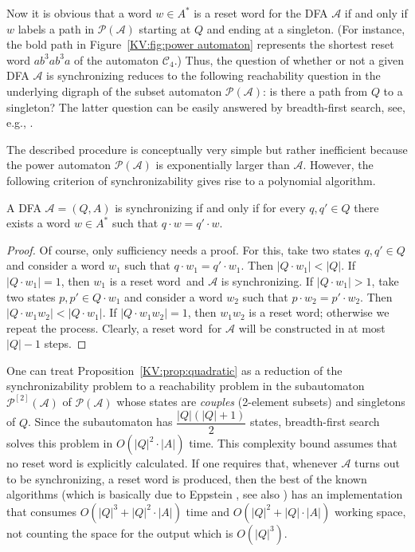 \documentclass{irmaart}
\newcommand{\sw}{reset word}
\theoremstyle{plain}
\begin{document}
Now it is obvious that a word $w\in A^*$ is a reset word for the
DFA $\mathcal{A}$ if and only if $w$ labels a path in
$\mathcal{P}(\mathcal{A})$ starting at $Q$ and ending at a
singleton. (For instance, the bold path in
Figure~\ref{KV:fig:power automaton} represents the shortest reset
word $ab^3ab^3a$ of the automaton $\mathcal{C}_4$.) Thus, the
question of whether or not a given DFA $\mathcal{A}$ is
synchronizing reduces to the following reachability question in
the underlying digraph of the subset automaton
$\mathcal{P}(\mathcal{A})$: is there a path from $Q$ to a
singleton? The latter question can be easily answered by
breadth-first search,  see, e.g.,
\cite[Section~22.2]{Cormen&Leiserson&Rivest&Stein:2001}.

The described procedure is conceptually very simple but rather inefficient
because the power automaton $\mathcal{P}(\mathcal{A})$ is exponentially larger
than $\mathcal{A}$. However, the following criterion of synchronizability gives
rise to a polynomial algorithm.
\begin{proposition}
\label{KV:prop:quadratic} A DFA $\mathcal{A}=(Q,A)$ is synchronizing if and
only if for every $q,q'\in Q$ there exists a word $w\in A^*$ such that $q\cdot
w=q'\cdot w$.
\end{proposition}

\begin{proof}
Of course, only sufficiency needs a proof. For this, take two
states $q,q'\in Q$ and consider a word $w_1$ such that $q\cdot
w_1=q'\cdot w_1$. Then $|Q\cdot w_1|<|Q|$. If $|Q\cdot w_1|=1$,
then $w_1$ is a \sw\ and $\mathcal{A}$ is synchronizing. If
$|Q\cdot w_1|>1$, take two states $p,p'\in Q\cdot w_1$ and
consider a word $w_2$ such that $p\cdot w_2=p'\cdot w_2$. Then
$|Q\cdot w_1w_2|<|Q\cdot w_1|$. If $|Q\cdot w_1w_2|=1$, then
$w_1w_2$ is a \sw; otherwise we repeat the process. Clearly, a
\sw\ for $\mathcal{A}$ will be constructed in at most $|Q|-1$
steps.
\end{proof}

One can treat Proposition~\ref{KV:prop:quadratic} as a reduction of the
synchronizability problem to a reachability problem in the subautomaton
$\mathcal{P}^{[2]}(\mathcal{A})$ of $\mathcal{P}(\mathcal{A})$ whose states are
\emph{couples} (2-element subsets) and singletons of $Q$. Since
the subautomaton has $\dfrac{|Q|(|Q|+1)}2$ states, breadth-first search solves
this problem in $O(|Q|^2\cdot|A|)$ time. This complexity bound assumes that no
reset word is explicitly calculated. If one requires that, whenever
$\mathcal{A}$ turns out to be synchronizing, a reset word is produced, then the
best of the known algorithms (which is basically due to Eppstein
\cite[Theorem~6]{Eppstein:1990}, see also \cite[Theorem~1.15]{Sandberg:2005})
has an implementation that consumes $O(|Q|^3 + |Q|^2\cdot|A|)$ time and
$O(|Q|^2 + |Q|\cdot|A|)$ working space, not counting the space for the output
which is $O(|Q|^3)$.
\end{document}
